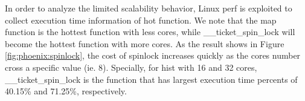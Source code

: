 In order to analyze the limited scalability behavior, Linux perf is exploited to collect execution time information of hot function. 
We note that the map function is the hottest function with less cores, while \_\_ticket\_spin\_lock will become the hottest function with more cores.
As the result shows in Figure \ref{fig:phoenix:spinlock}, the cost of spinlock increases quickly as the cores number cross a specific value (ie. 8).
Specially, for hist with 16 and 32 cores, \_\_ticket\_spin\_lock is the function that has largest execution time percents of 40.15\%  and 71.25\%, respectively. 

